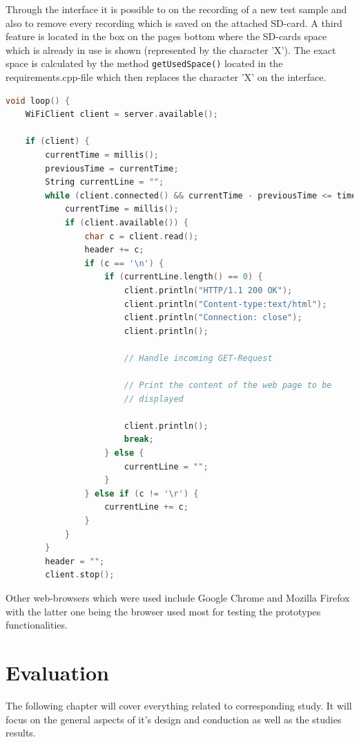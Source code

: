 Through the interface it is possible to on the recording of a new test sample and also to remove every recording which is saved on the attached SD-card.
A third feature is located in the box on the pages bottom where the SD-cards space which is already in use is shown (represented by the character 'X').
The exact space is calculated by the method \texttt{getUsedSpace()} located in the requirements.cpp-file which then replaces the character 'X' on the interface. 
\begin{lstlisting}[frame=single, language={c++}, style=style,
	caption={The part of the loop-function which is used to manage the connection of a socket hosted on the microcontroller to a web-client.}, label={lst:WiFiCon},float=!htb]
void loop() {
	WiFiClient client = server.available();
	
	if (client) {
		currentTime = millis();
		previousTime = currentTime;
		String currentLine = "";
		while (client.connected() && currentTime - previousTime <= timeoutTime) {
			currentTime = millis();
			if (client.available()) {
				char c = client.read();
				header += c;
				if (c == '\n') {
					if (currentLine.length() == 0) {
						client.println("HTTP/1.1 200 OK");
						client.println("Content-type:text/html");
						client.println("Connection: close");
						client.println();
						
						// Handle incoming GET-Request
						
						// Print the content of the web page to be
						// displayed
						
						client.println();
						break;
					} else {
						currentLine = "";
					}
				} else if (c != '\r') {
					currentLine += c;
				}
			}
		}
		header = "";
		client.stop();
\end{lstlisting}

Other web-browsers which were used include Google Chrome and Mozilla Firefox with the latter one being the browser used most for testing the prototypes functionalities.

\section{Evaluation}
The following chapter will cover everything related to corresponding study. 
It will focus on the general aspects of it's design and conduction as well as the studies results.

